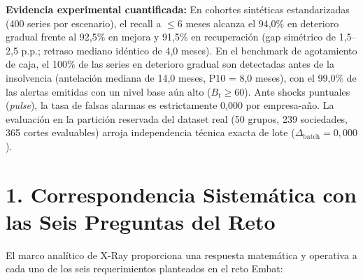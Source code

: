 \documentclass[10pt,a4paper]{article}
\begin{document}
\begin{tcolorbox}[paperbox, title=Resumen Ejecutivo y Declaración de Alcance Metodológico]
\textbf{Evidencia experimental cuantificada:} En cohortes sintéticas estandarizadas (400 series por escenario), el recall a $\le 6$ meses alcanza el 94,0\% en deterioro gradual frente al 92,5\% en mejora y 91,5\% en recuperación (gap simétrico de 1,5--2,5 p.p.; retraso mediano idéntico de 4,0 meses). En el benchmark de agotamiento de caja, el 100\% de las series en deterioro gradual son detectadas antes de la insolvencia (antelación mediana de 14,0 meses, P10 = 8,0 meses), con el 99,0\% de las alertas emitidas con un nivel base aún alto ($B_t \ge 60$). Ante shocks puntuales (\emph{pulse}), la tasa de falsas alarmas es estrictamente 0,000 por empresa-año. La evaluación en la partición reservada del dataset real (50 grupos, 239 sociedades, 365 cortes evaluables) arroja independencia técnica exacta de lote ($\Delta_{\text{batch}} = 0{,}000$).
\end{tcolorbox}

\vspace{0.2em}

\section*{1. Correspondencia Sistemática con las Seis Preguntas del Reto}

El marco analítico de X-Ray proporciona una respuesta matemática y operativa a cada uno de los seis requerimientos planteados en el reto Embat:
\end{document}
